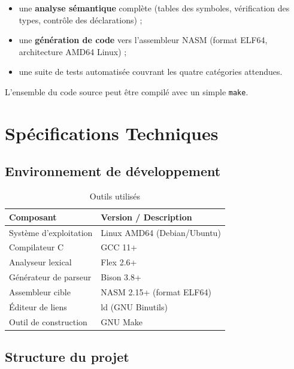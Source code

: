 \documentclass[12pt,a4paper]{article}
\newcommand{\nasm}{\textsc{NASM}}
\begin{document}
\begin{itemize}
  \item une \textbf{analyse sémantique} complète (tables des symboles, vérification
        des types, contrôle des déclarations) ;
  \item une \textbf{génération de code} vers l'assembleur \nasm{} (format ELF64,
        architecture AMD64 Linux) ;
  \item une suite de tests automatisée couvrant les quatre catégories attendues.
\end{itemize}

L'ensemble du code source peut être compilé avec un simple \texttt{make}.

\section{Spécifications Techniques}

\subsection{Environnement de développement}

\begin{table}[H]
\centering
\begin{tabularx}{\linewidth}{lX}
\toprule
\textbf{Composant} & \textbf{Version / Description} \\
\midrule
Système d'exploitation & Linux AMD64 (Debian/Ubuntu) \\
Compilateur C          & GCC 11+ \\
Analyseur lexical      & Flex 2.6+ \\
Générateur de parseur  & Bison 3.8+ \\
Assembleur cible       & NASM 2.15+ (format ELF64) \\
Éditeur de liens       & ld (GNU Binutils) \\
Outil de construction  & GNU Make \\
\bottomrule
\end{tabularx}
\caption{Outils utilisés}
\end{table}

\subsection{Structure du projet}
\end{document}
